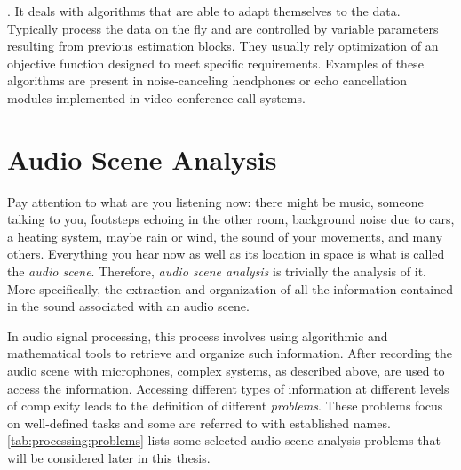 .
    It deals with algorithms that are able to adapt themselves to the data.
    Typically process the data on the fly and are controlled by variable parameters resulting from previous estimation blocks.
    They usually rely optimization of an objective function designed to meet specific requirements.
    Examples of these algorithms are present in noise-canceling headphones or echo cancellation modules implemented in video conference call systems.



\section{Audio Scene Analysis}\label{sec:intro:scene}
Pay attention to what are you listening now:
there might be music, someone talking to you, footsteps echoing in the other room, background noise due to cars, a heating system, maybe rain or wind, the sound of your movements, and many others.
Everything you hear now as well as its location in space is what is called the \textit{audio scene}.
Therefore, \textit{audio scene analysis} is trivially the analysis of it.
More specifically, the extraction and organization of all the information contained in the sound associated with an audio scene.

\mynewline
In audio signal processing, this process involves using algorithmic and mathematical tools to retrieve and organize such information.
After recording the audio scene with microphones, complex systems, as described above, are used to access the information.
Accessing different types of information at different levels of complexity leads to the definition of different \textit{problems}.
These problems focus on well-defined tasks and some are referred to with established names.
\cref{tab:processing:problems} lists some selected audio scene analysis problems that will be considered later in this thesis.

